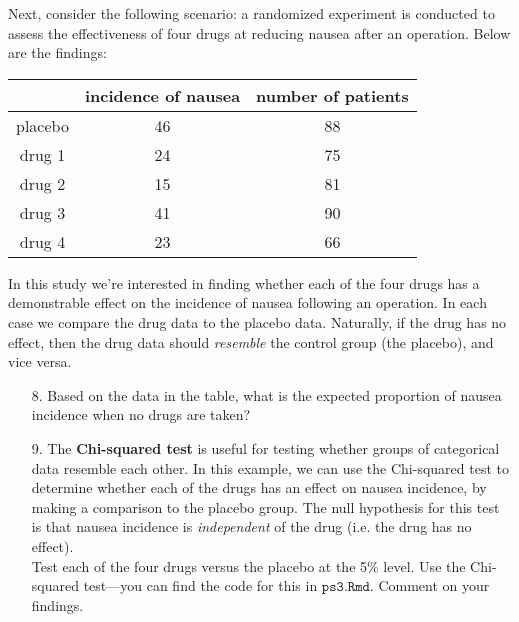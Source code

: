 \documentclass[10pt]{extarticle}
\begin{document}
Next, consider the following scenario: a randomized experiment is conducted to assess the effectiveness of four drugs at reducing nausea after an operation. Below are the findings: \\  

\begin{center}
        \begin{tabular}{c c c}
                \hline
                  & incidence of nausea & number of patients \\
                 \hline
                 placebo & 46 & 88 \\
                 drug 1 & 24 & 75 \\
                 drug 2 & 15 & 81 \\
		 drug 3 & 41 & 90 \\ 
		 drug 4 & 23 & 66 \\ 
                 \hline
        \end{tabular}
\end{center} 

\hfill 

In this study we're interested in finding whether each of the four drugs has a demonstrable effect on the incidence of nausea following an operation. In each case we compare the drug data to the placebo data. Naturally, if the drug has no effect, then the drug data should {\it resemble} the control group (the placebo), and vice versa.  

\hfill 

\begin{itemize}

	\item[8.] Based on the data in the table, what is the expected proportion of nausea incidence when no drugs are taken? \\ 

	\item[9.] The {\bf Chi-squared test} is useful for testing whether groups of categorical data resemble each other. In this example, we can use the Chi-squared test to determine whether each of the drugs has an effect on nausea incidence, by making a comparison to the placebo group. The null hypothesis for this test is that nausea incidence is {\it independent} of the drug (i.e. the drug has no effect). \\ 

Test each of the four drugs versus the placebo at the 5\% level. Use the Chi-squared test---you can find the code for this in $\texttt{ps3.Rmd}$. Comment on your findings.  

\end{itemize}
\end{document}
